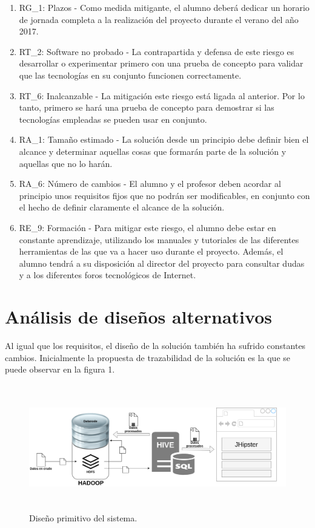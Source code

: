 \begin{enumerate}
\begin{enumerate}
\item RG\_1: Plazos - Como medida mitigante, el alumno deberá dedicar un horario de jornada completa a la realización del proyecto durante el verano del año 2017. 
\item RT\_2: Software no probado - La contrapartida y defensa de este riesgo es desarrollar o experimentar primero con una prueba de concepto para validar que las tecnologías en su conjunto funcionen correctamente. 
\item RT\_6: Inalcanzable - La mitigación este riesgo está ligada al anterior. Por lo tanto, primero se hará una prueba de concepto para demostrar si las tecnologías empleadas se pueden usar en conjunto.
\item RA\_1: Tamaño estimado - La solución desde un principio debe definir bien el alcance y determinar aquellas cosas que formarán parte de la solución y aquellas que no lo harán. 
\item RA\_6: Número de cambios - El alumno y el profesor deben acordar al principio unos requisitos fijos que no podrán ser modificables, en conjunto con el hecho de definir claramente el alcance de la solución.
\item RE\_9: Formación - Para mitigar este riesgo, el alumno debe estar en constante aprendizaje, utilizando los manuales y tutoriales de las diferentes herramientas de las que va a hacer uso durante el proyecto. Además, el alumno tendrá a su disposición al director del proyecto para consultar dudas y a los diferentes foros tecnológicos de Internet. 
\end{enumerate}
\end{enumerate}

\section{Análisis de diseños alternativos}

Al igual que los requisitos, el diseño de la solución también ha sufrido constantes cambios. Inicialmente la propuesta de trazabilidad de la solución es la que se puede observar en la figura 1. \par

\begin{figure}[H]
    \centering
    \includegraphics[width=1\textwidth,height=5.5cm]{Imagenes/Dis_Fig_1}
    \caption{Diseño primitivo del sistema.}
    \label{fig:dis_1_sist}
\end{figure}
\par



